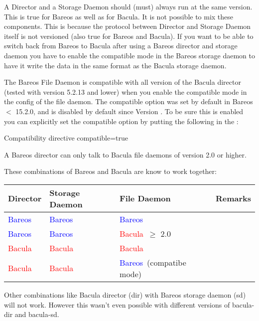 A Director and a Storage Daemon should (must) always run at the same version.
This is true for Bareos as well as for Bacula.
It is not possible to mix these components.
This is because the protocol between Director and Storage Daemon itself is not versioned (also true for Bareos and Bacula).
If you want to be able to switch back from Bareos to Bacula after using a Bareos director and storage daemon
you have to enable the compatible mode in the Bareos storage daemon to have it write the data in the same
format as the Bacula storage daemon.

The Bareos File Daemon is compatible with all version of the Bacula director (tested with version 5.2.13 and lower)
when you enable the compatible mode in the config of the file daemon.
The compatible option was set by default in Bareos $<$ 15.2.0, and is disabled by default since Version
.
To be sure this is enabled you can explicitly set the compatible option
by putting the following in the :

\begin{bconfig}{Compatibility directive}
compatible=true
\end{bconfig}


A Bareos director can only talk to Bacula file daemons of version 2.0 or higher.

\newcommand{\bareoscolor}{\textcolor{blue}{Bareos\ }}
\newcommand{\baculacolor}{\textcolor{red}{Bacula\ }}


These combinations of Bareos and Bacula are know to work together:

\begin{tabular}[h]{|l|l|l|l|}
  \hline
  \textbf{Director} & \textbf{Storage Daemon} & \textbf{File Daemon} & \textbf{Remarks} \\
  \hline
  \hline
  \bareoscolor & \bareoscolor & \bareoscolor & \\
  \hline
  \bareoscolor & \bareoscolor & \baculacolor $\ge$ 2.0 & \\
  \hline
  \baculacolor & \baculacolor & \baculacolor & \\
  \hline
  \baculacolor & \baculacolor & \bareoscolor (compatibe mode) & \\
  \hline
\end{tabular}

Other combinations like Bacula director (dir) with Bareos storage daemon (sd) will not work. However this wasn't even possible with different versions of bacula-dir and bacula-sd.

